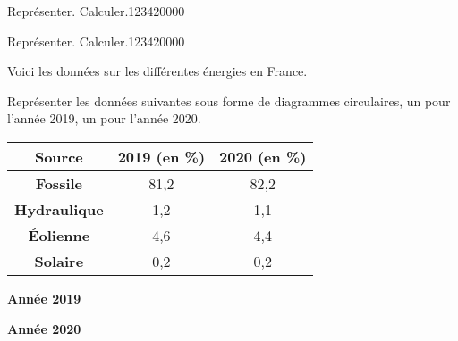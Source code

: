 \begin{pageAuto}
\begin{ExoAuto}{Représenter. Calculer.}{1234}{2}{0}{0}{0}{0}
\end{ExoAuto}
\begin{ExoAuto}{Représenter. Calculer.}{1234}{2}{0}{0}{0}{0}

 \begin{minipage}{0.48\linewidth}
 Voici les données sur les différentes énergies en France. 
 
 \vspace{0.2cm}
 
 Représenter les données suivantes sous forme de diagrammes circulaires, un pour l'année 2019, un pour l'année 2020.
\end{minipage}
 \begin{minipage}{0.5\linewidth}
\begin{center}
\begin{tabular}{|c|c|c|}\hline 
\textbf{Source} & \textbf{2019} (en \%) & \textbf{2020} (en \%) \\\hline 
\textbf{Fossile} &	81,2 &	82,2\\\hline
\textbf{Hydraulique} &  1,2	& 1,1\\\hline
\textbf{Éolienne} & 4,6	& 4,4\\\hline
\textbf{Solaire} & 0,2 & 0,2\\\hline 
\end{tabular}
\end{center}
\end{minipage}


\begin{minipage}{0.48\linewidth}

\begin{center}


\textbf{Année 2019}
\end{center}
\end{minipage}
\begin{minipage}{0.5\linewidth}
\begin{center}

\textbf{Année 2020}
\end{center}
\end{minipage} 

\end{ExoAuto}
 

\end{pageAuto}

